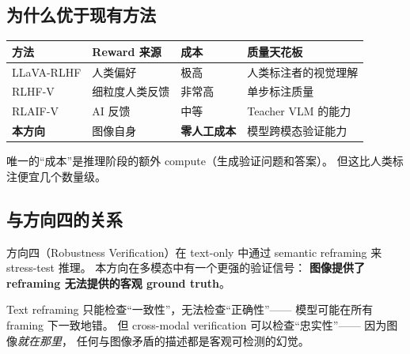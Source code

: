 \documentclass[12pt,a4paper]{article}
\begin{document}
\subsection{为什么优于现有方法}

\begin{table}[h]
\centering
\small
\begin{tabular}{p{3.5cm}p{3cm}p{3cm}p{3cm}}
\toprule
\textbf{方法} & \textbf{Reward 来源} & \textbf{成本} & \textbf{质量天花板} \\
\midrule
LLaVA-RLHF
  & 人类偏好
  & 极高
  & 人类标注者的视觉理解 \\
RLHF-V
  & 细粒度人类反馈
  & 非常高
  & 单步标注质量 \\
RLAIF-V
  & AI 反馈
  & 中等
  & Teacher VLM 的能力 \\
\textbf{本方向}
  & 图像自身
  & \textbf{零人工成本}
  & 模型跨模态验证能力 \\
\bottomrule
\end{tabular}
\end{table}

\noindent
唯一的``成本''是推理阶段的额外 compute（生成验证问题和答案）。
但这比人类标注便宜几个数量级。

\subsection{与方向四的关系}

方向四（Robustness Verification）在 text-only 中通过 semantic reframing
来 stress-test 推理。
本方向在多模态中有一个更强的验证信号：
\textbf{图像提供了 reframing 无法提供的客观 ground truth}。

Text reframing 只能检查``一致性''，无法检查``正确性''——
模型可能在所有 framing 下一致地错。
但 cross-modal verification 可以检查``忠实性''——
因为图像\textit{就在那里}，
任何与图像矛盾的描述都是客观可检测的幻觉。
\end{document}
